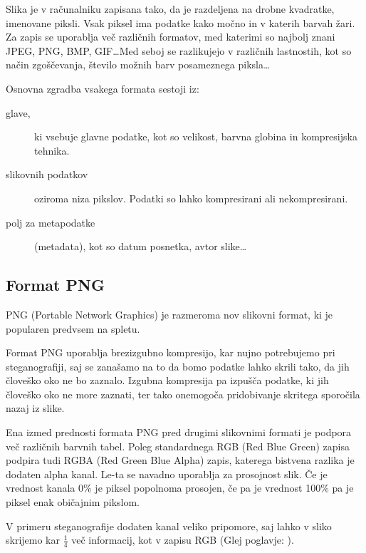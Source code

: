 \label{zapisslik}
Slika je v računalniku zapisana tako, da je razdeljena na drobne kvadratke, imenovane piksli. Vsak piksel ima podatke kako močno in v katerih barvah žari. Za zapis se uporablja več različnih formatov, med katerimi so najbolj znani JPEG, PNG, BMP, GIF\ldots Med seboj se razlikujejo v različnih lastnostih, kot so način zgoščevanja, število možnih barv posameznega piksla\ldots

Osnovna zgradba vsakega formata sestoji iz:
\begin{description}
    \item [glave,] ki vsebuje glavne podatke, kot so velikost, barvna globina in kompresijska tehnika.
    \item [slikovnih podatkov] oziroma niza pikslov. Podatki so lahko kompresirani ali nekompresirani.
    \item [polj za metapodatke] (metadata), kot so datum posnetka, avtor slike\ldots
\end{description}

\subsection{Format PNG}
    PNG (Portable Network Graphics) je razmeroma nov slikovni format, ki je popularen predvsem na spletu.

    Format PNG uporablja brezizgubno kompresijo, kar nujno potrebujemo pri steganografiji, saj se zanašamo na to da bomo podatke lahko skrili tako, da jih človeško oko ne bo zaznalo. Izgubna kompresija pa izpušča podatke, ki jih človeško oko ne more zaznati, ter tako onemogoča pridobivanje skritega sporočila nazaj iz slike.

    Ena izmed prednosti formata PNG pred drugimi slikovnimi formati je podpora več različnih barvnih tabel. Poleg standardnega RGB (Red Blue Green) zapisa podpira tudi RGBA (Red Green Blue Alpha) zapis, katerega bistvena razlika je dodaten alpha kanal. Le-ta se navadno uporablja za prosojnost slik. Če je vrednost kanala 0\% je piksel popolnoma prosojen, če pa je vrednost 100\% pa je piksel enak običajnim pikslom.

    V primeru steganografije dodaten kanal veliko pripomore, saj lahko v sliko skrijemo kar $\frac{1}{4}$ več informacij, kot v zapisu RGB (Glej poglavje: ).
